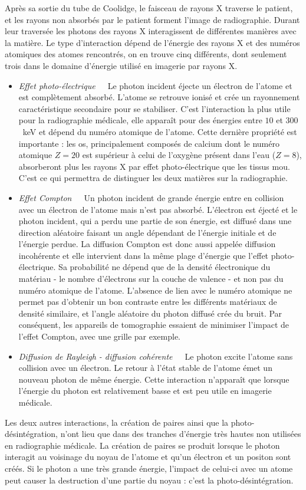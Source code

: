 Après sa sortie du tube de Coolidge, le faisceau de rayons X traverse le patient, et les rayons non absorbés par le patient forment l'image de radiographie. Durant leur traversée les photons des rayons X interagissent de différentes manières avec la matière. Le type d'interaction dépend de l'énergie des rayons X et des numéros atomiques des atomes rencontrés, on en trouve cinq différents, dont seulement trois dans le domaine d'énergie utilisé en imagerie par rayons X. 
\begin{itemize}
	\item[] {\it Effet photo-électrique}~~~Le photon incident éjecte un électron de l'atome et est complètement absorbé. L'atome se retrouve ionisé et crée un rayonnement caractéristique secondaire pour se stabiliser. C'est l'interaction la plus utile pour la radiographie médicale, elle apparaît pour des énergies entre $10$ et $300$~keV et dépend du numéro atomique de l'atome. Cette dernière propriété est importante : les os, principalement composés de calcium dont le numéro atomique $Z=20$ est supérieur à celui de l'oxygène présent dans l'eau ($Z=8$), absorberont plus les rayons X par effet photo-électrique que les tissus mou. C'est ce qui permettra de distinguer les deux matières sur la radiographie.
	\item[] {\it Effet Compton}~~~Un photon incident de grande énergie entre en collision avec un électron de l'atome mais n'est pas absorbé. L'électron est éjecté et le photon incident, qui a perdu une partie de son énergie, est diffusé dans une direction aléatoire faisant un angle dépendant de l'énergie initiale et de l'énergie perdue. La diffusion Compton est donc aussi appelée diffusion incohérente et elle intervient dans la même plage d'énergie que l'effet photo-électrique. Sa probabilité ne dépend que de la densité électronique du matériau - le nombre d'électrons sur la couche de valence - et non pas du numéro atomique de l'atome. L'absence de lien avec le numéro atomique ne permet pas d'obtenir un bon contraste entre les différents matériaux de densité similaire, et l'angle aléatoire du photon diffusé crée du bruit. Par conséquent, les appareils de tomographie essaient de minimiser l'impact de l'effet Compton, avec une grille par exemple.
	\item[] {\it Diffusion de Rayleigh - diffusion cohérente}~~~Le photon excite l'atome sans collision avec un électron. Le retour à l'état stable de l'atome émet un nouveau photon de même énergie. Cette interaction n'apparaît que lorsque l'énergie du photon est relativement basse et est peu utile en imagerie médicale.
\end{itemize}
Les deux autres interactions, la création de paires ainsi que la photo-désintégration, n'ont lieu que dans des tranches d'énergie très hautes non utilisées en radiographie médicale. La création de paires se produit lorsque le photon interagit au voisinage du noyau de l'atome et qu'un électron et un positon sont créés. Si le photon a une très grande énergie, l'impact de celui-ci avec un atome peut causer la destruction d'une partie du noyau : c'est la photo-désintégration. 

